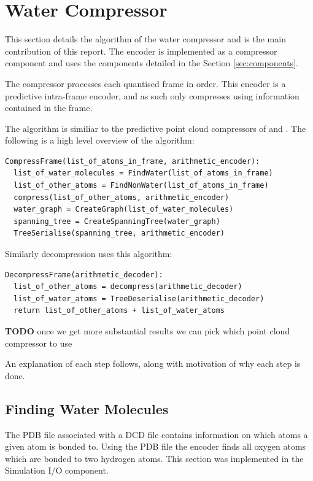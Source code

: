 \documentclass{report}
\newcommand{\todo}{\textbf{TODO} }
\begin{document}
\section{Water Compressor}

This section details the algorithm of the water compressor and is the main
contribution of this report. The encoder is implemented as a compressor
component and uses the components detailed in the Section
\ref{sec:components}.

The compressor processes each quantised frame in order. This encoder is a
predictive intra-frame encoder, and as such only compresses using information
contained in the frame.

The algorithm is similiar to the predictive point cloud compressors of
\citep{gumholdcomp} and \citep{merrycomp}. The following is a high level
overview of the algorithm:

\begin{verbatim}
CompressFrame(list_of_atoms_in_frame, arithmetic_encoder):
  list_of_water_molecules = FindWater(list_of_atoms_in_frame)
  list_of_other_atoms = FindNonWater(list_of_atoms_in_frame)
  compress(list_of_other_atoms, arithmetic_encoder)
  water_graph = CreateGraph(list_of_water_molecules)
  spanning_tree = CreateSpanningTree(water_graph)
  TreeSerialise(spanning_tree, arithmetic_encoder)
\end{verbatim}

\noindent Similarly decompression uses this algorithm:

\begin{verbatim}
DecompressFrame(arithmetic_decoder):
  list_of_other_atoms = decompress(arithmetic_decoder)
  list_of_water_atoms = TreeDeserialise(arithmetic_decoder)
  return list_of_other_atoms + list_of_water_atoms
\end{verbatim}

\todo once we get more substantial results we can pick which point cloud
compressor to use

An explanation of each step follows, along with motivation of why each step is
done.


\subsection{Finding Water Molecules}

The PDB file associated with a DCD file contains information on which atoms a
given atom is bonded to. Using the PDB file the encoder finds all oxygen atoms
which are bonded to two hydrogen atoms. This section was implemented in the
Simulation I/O component.
\end{document}
